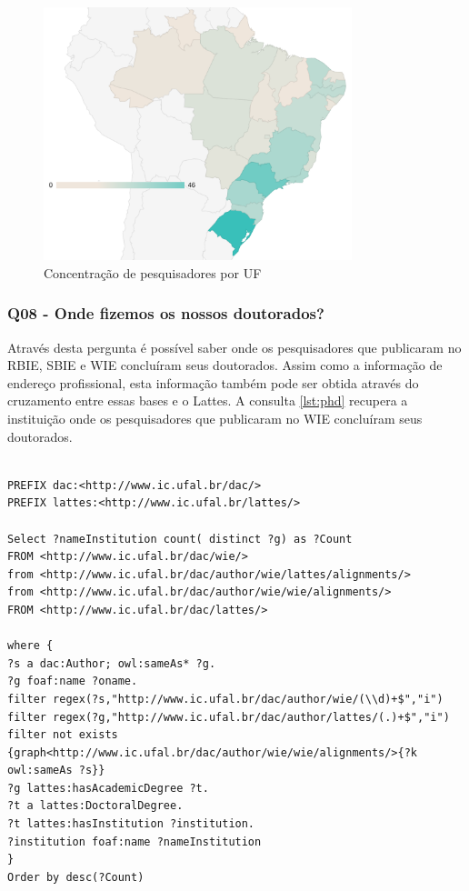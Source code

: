 \begin{figure}[!ht]
	\centering
	\includegraphics[width=0.8\textwidth]{./imagens/where.pdf}
	\caption{Concentração de pesquisadores por UF}
	\label{fig:where}
\end{figure}

\subsubsection{Q08 - Onde fizemos os nossos doutorados?}
Através desta pergunta é possível saber onde os pesquisadores que publicaram no RBIE, SBIE e WIE concluíram seus doutorados. Assim como a informação de endereço profissional, esta informação também pode ser obtida através do cruzamento entre essas bases e o Lattes. A consulta \ref{lst:phd} recupera a instituição onde os pesquisadores que publicaram no WIE concluíram seus doutorados.

\begin{lstlisting}[captionpos=b, caption= Consulta para recuperar a concentração de doutorados por universidade, label=lst:phd,
basicstyle=\ttfamily,frame=single]

PREFIX dac:<http://www.ic.ufal.br/dac/>
PREFIX lattes:<http://www.ic.ufal.br/lattes/>

Select ?nameInstitution count( distinct ?g) as ?Count
FROM <http://www.ic.ufal.br/dac/wie/>
from <http://www.ic.ufal.br/dac/author/wie/lattes/alignments/>
from <http://www.ic.ufal.br/dac/author/wie/wie/alignments/>
FROM <http://www.ic.ufal.br/dac/lattes/>

where {
?s a dac:Author; owl:sameAs* ?g.
?g foaf:name ?oname.
filter regex(?s,"http://www.ic.ufal.br/dac/author/wie/(\\d)+$","i")
filter regex(?g,"http://www.ic.ufal.br/dac/author/lattes/(.)+$","i")
filter not exists {graph<http://www.ic.ufal.br/dac/author/wie/wie/alignments/>{?k owl:sameAs ?s}}
?g lattes:hasAcademicDegree ?t.
?t a lattes:DoctoralDegree.
?t lattes:hasInstitution ?institution.
?institution foaf:name ?nameInstitution
}
Order by desc(?Count)
\end{lstlisting}

